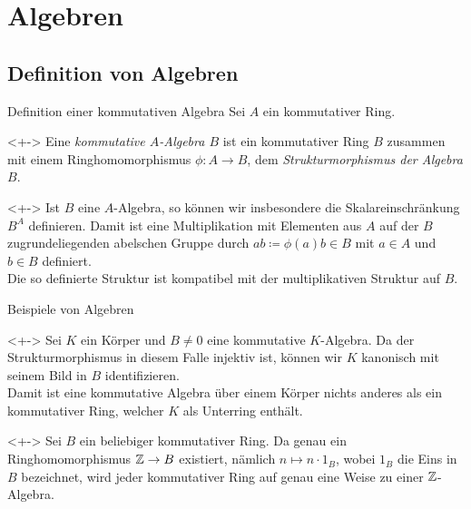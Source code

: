 \section{Algebren}

\subsection{Definition von Algebren}

\begin{frame}{Definition einer kommutativen Algebra}
	Sei \(A\) ein kommutativer Ring.
	\begin{definition}<+->
		Eine \emph{kommutative \(A\)-Algebra \(B\)} ist ein kommutativer Ring \(B\) zusammen mit einem
		Ringhomomorphismus \(\phi\colon A \to B\), dem \emph{Strukturmorphismus der Algebra \(B\)}.
	\end{definition}
	\begin{remark}<+->
		Ist \(B\) eine \(A\)-Algebra, so können wir insbesondere die Skalareinschränkung
		\(B^A\) definieren. Damit ist eine Multiplikation mit Elementen aus \(A\) auf der
		\(B\) zugrundeliegenden abelschen Gruppe durch \(a b \coloneqq \phi(a) b \in B\) mit \(a \in A\)
		und \(b \in B\) definiert.
		\\
		Die so definierte Struktur ist kompatibel mit der multiplikativen Struktur auf \(B\).
	\end{remark}
\end{frame}

\begin{frame}{Beispiele von Algebren}
	\begin{example}<+->
		Sei \(K\) ein Körper und \(B \neq 0\) eine kommutative \(K\)-Algebra. Da der Strukturmorphismus in diesem
		Falle injektiv ist, können wir \(K\) kanonisch mit seinem Bild in \(B\) identifizieren.
		\\
		Damit ist eine kommutative Algebra über einem Körper nichts anderes als ein kommutativer Ring, welcher \(K\)
		als Unterring enthält.
	\end{example}
	\begin{example}<+->
		Sei \(B\) ein beliebiger kommutativer Ring. Da genau ein Ringhomomorphismus \(\mathbb Z \to B\) existiert,
		nämlich \(n \mapsto n \cdot 1_B\), wobei \(1_B\) die Eins in \(B\) bezeichnet, wird jeder kommutativer
		Ring auf genau eine Weise zu einer \(\mathbb Z\)-Algebra.
	\end{example}
\end{frame}

